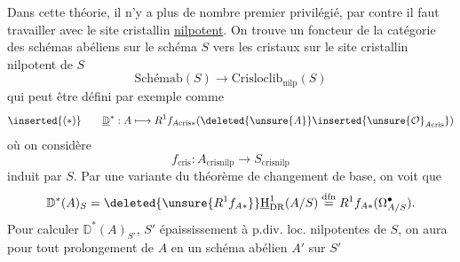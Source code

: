  Dans cette théorie, il n'y a plus de nombre premier privilégié, par contre il faut travailler avec le site cristallin \uline{nilpotent}. On trouve un foncteur  de la catégorie des schémas abéliens sur le schéma $S$ vers les  cristaux sur le site cristallin nilpotent de $S$
\[
\text{Schémab}(S)\longrightarrow\mathrm{Crisloclib}_{\mathrm{nilp}}(S)
\]
qui peut être défini par exemple comme
\[
\inserted{(*)}\qquad \underline{\mathbb D}^{*}:A\longmapsto R^1f_{A\mathrm{cris}*}
(\deleted{\unsure{A}}\inserted{\unsure{\mathcal O}_{A\mathrm{cris}}})
\]
où on considère
\[
f_{\mathrm{cris}}:A_{\mathrm{crisnilp}}\longrightarrow S_{\mathrm{crisnilp}}
\]
induit par $S$. Par une variante du théorème de changement de base, on voit que
\[
\mathbb D^*(A)_S=\deleted{\unsure{R^1f_{A*}}}\underline{\mathrm H}^1_{\mathrm{DR}}(A/S)
\overset{\mathrm{dfn}}=R^1f_{A*}(\Omega^\bullet_{A/S}).
\]
Pour calculer $\mathbb D^*(A)_{S'}$, $S'$ épaississement à p.div. loc. nilpotentes de $S$, on aura pour tout prolongement  de $A$ en un schéma abélien $A'$ sur $S'$
